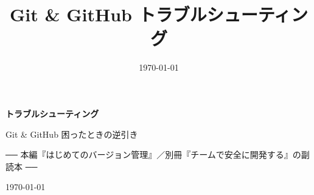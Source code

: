 \documentclass[book, paper=a4, fontsize=10.5pt, titlepage]{jlreq}
\title{Git \& GitHub トラブルシューティング}
\author{}
\date{\today}
\begin{document}
\begin{titlepage}
  \centering
  \vspace*{4cm}
  {\sffamily\bfseries\Huge トラブルシューティング\par}
  \vspace{1.2cm}
  {\sffamily\Large Git \& GitHub 困ったときの逆引き\par}
  \vspace{0.6cm}
  {\sffamily\normalsize ── 本編『はじめてのバージョン管理』／別冊『チームで安全に開発する』の副読本 ──\par}
  \vfill
  {\large \today\par}
\end{titlepage}

\tableofcontents
\clearpage


\end{document}
